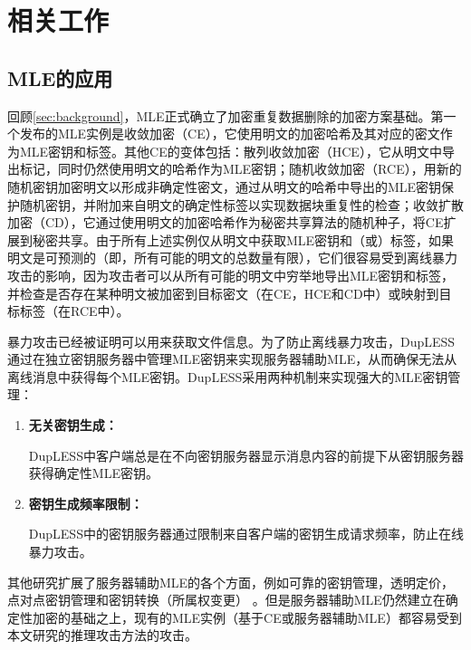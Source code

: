 \chapter{相关工作}
\label{sec:RelatedWork}

\section{MLE的应用}

回顾\ref{sec:background}，MLE正式确立了加密重复数据删除的加密方案基础。第一个发布的MLE实例是收敛加密（CE），它使用明文的加密哈希及其对应的密文作为MLE密钥和标签。其他CE的变体包括：散列收敛加密（HCE），它从明文中导出标记，同时仍然使用明文的哈希作为MLE密钥；随机收敛加密（RCE），用新的随机密钥加密明文以形成非确定性密文，通过从明文的哈希中导出的MLE密钥保护随机密钥，并附加来自明文的确定性标签以实现数据块重复性的检查；收敛扩散加密（CD），它通过使用明文的加密哈希作为秘密共享算法的随机种子，将CE扩展到秘密共享。由于所有上述实例仅从明文中获取MLE密钥和（或）标签，如果明文是可预测的（即，所有可能的明文的总数量有限），它们很容易受到离线暴力攻击的影响，因为攻击者可以从所有可能的明文中穷举地导出MLE密钥和标签，并检查是否存在某种明文被加密到目标密文（在CE，HCE和CD中）或映射到目标标签（在RCE中）。

暴力攻击已经被证明可以用来获取文件信息。为了防止离线暴力攻击，DupLESS通过在独立密钥服务器中管理MLE密钥来实现服务器辅助MLE，从而确保无法从离线消息中获得每个MLE密钥。DupLESS采用两种机制来实现强大的MLE密钥管理：
\begin{enumerate}
    \item \textbf{无关密钥生成：}
        
        DupLESS中客户端总是在不向密钥服务器显示消息内容的前提下从密钥服务器获得确定性MLE密钥。
    \item \textbf{密钥生成频率限制：}
        
        DupLESS中的密钥服务器通过限制来自客户端的密钥生成请求频率，防止在线暴力攻击。
\end{enumerate}

其他研究扩展了服务器辅助MLE的各个方面，例如可靠的密钥管理，透明定价，点对点密钥管理和密钥转换（所属权变更） 。但是服务器辅助MLE仍然建立在确定性加密的基础之上，现有的MLE实例（基于CE或服务器辅助MLE）都容易受到本文研究的推理攻击方法的攻击。


